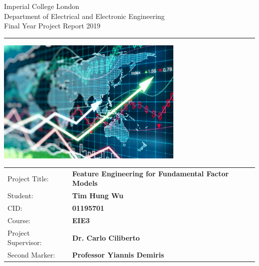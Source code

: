 \documentclass[10pt,onecolumn,letterpaper]{article}
\begin{document}
\begin{titlepage}
                \setlength{\parindent}{0pt}
                \setlength{\parskip}{0pt}

                {
                                \Large
                                \raggedright
                                Imperial College London\\[17pt]
                                Department of Electrical and Electronic Engineering\\[17pt]
                                Final Year Project Report 2019\\[17pt]
                }

                \rule{\columnwidth}{3pt}
                \vfill
                \centering
                  \includegraphics[width=0.7\columnwidth,height=60mm,keepaspectratio]{logo.png}
                \vfill
                \setlength{\tabcolsep}{0pt}
                \begin{tabular}{p{40mm}p{\dimexpr\columnwidth-40mm}}
                      	Project Title: & \textbf{Feature Engineering for Fundamental Factor Models} \\[12pt]
                       	Student: & \textbf{Tim Hung Wu} \\[12pt]
                        	CID: & \textbf{01195701} \\[12pt]
                	    	Course: & \textbf{EIE3} \\[12pt]
                        	Project Supervisor: & \textbf{Dr. Carlo Ciliberto} \\[12pt]
          		Second Marker: & \textbf{Professor Yiannis Demiris} \\[12pt]
                \end{tabular}
\end{titlepage}
\end{document}
